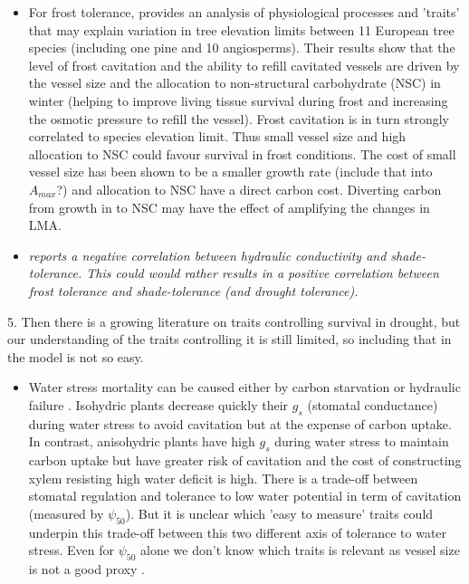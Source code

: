 \documentclass[a4paper,11pt]{article}
\begin{document}
\begin{itemize}
\item  For frost tolerance, \citet{Charrier-2013} provides an analysis of physiological processes and 'traits' that may explain variation in tree elevation limits between 11 European tree species (including one pine and 10 angiosperms). Their results show that the level of frost cavitation and the ability to refill cavitated vessels are driven by the vessel size and the allocation to non-structural carbohydrate (NSC) in winter (helping to improve living tissue survival during frost and increasing the osmotic pressure to refill the vessel). Frost cavitation is in turn strongly correlated to species elevation limit. Thus small vessel size and high allocation to NSC could favour survival in frost conditions. The cost of small vessel size has been shown to be a smaller growth rate \citep{Poorter-2010} (include that into $A_{max}$?) and allocation to NSC have a direct carbon cost. Diverting carbon from growth in to NSC may have the effect of amplifying the changes in LMA.
\item \textit{\citet{Markesteijn-2011} reports a negative correlation between hydraulic conductivity and shade-tolerance. This could would rather results in a positive correlation between frost tolerance and shade-tolerance (and drought tolerance).}
\end{itemize}

5. Then there is a growing literature on traits controlling survival in drought, but our understanding of the traits controlling it is still limited, so including that in the model is not so easy.

\begin{itemize}
\item Water stress mortality can be caused either by carbon starvation or hydraulic failure \citep{McDowell-2008,McDowell-2011,Skelton-2015}. Isohydric plants decrease quickly their $g_s$ (stomatal conductance) during water stress to avoid cavitation but at the expense of carbon uptake. In contrast, anisohydric plants have high $g_s$ during water stress to maintain carbon uptake but have greater risk of cavitation and the cost of constructing xylem resisting high water deficit is high. There is a trade-off between stomatal regulation and tolerance to low water potential in term of cavitation (measured by $\psi_{50}$). But it is unclear which 'easy to measure' traits could underpin this trade-off between this two different axis of tolerance to water stress. Even for $\psi_{50}$ alone we don't know which traits is relevant as vessel size is not a good proxy \citep{Maherali-2004}.
\end{itemize}
\end{document}
